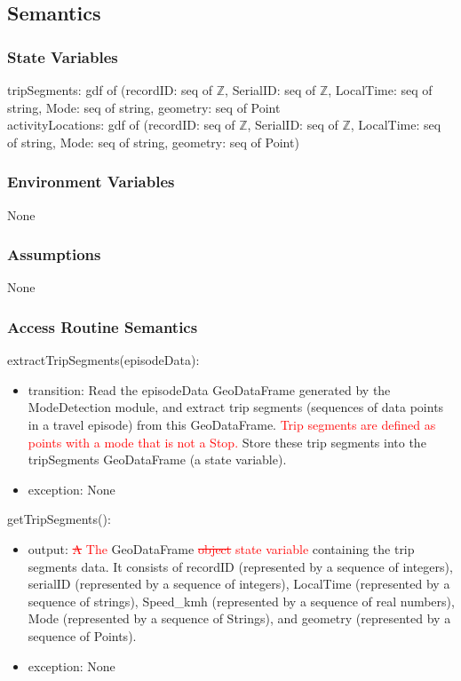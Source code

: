 \documentclass[12pt, titlepage]{article}
\begin{document}
\subsection{Semantics}

\subsubsection{State Variables}
tripSegments: gdf of (recordID: seq of $\mathbb{Z}$, SerialID: seq of $\mathbb{Z}$, LocalTime: seq of string, Mode: seq of string, geometry: seq of Point
\\
activityLocations: gdf of (recordID: seq of $\mathbb{Z}$, SerialID: seq of $\mathbb{Z}$, LocalTime: seq of string, Mode: seq of string, geometry: seq of Point)

\subsubsection{Environment Variables}

None

\subsubsection{Assumptions}

None

\subsubsection{Access Routine Semantics}

\noindent extractTripSegments(episodeData):
\begin{itemize}
\item transition: Read the episodeData GeoDataFrame generated by the ModeDetection module, and extract trip segments (sequences of data points in a travel episode) from this GeoDataFrame. \textcolor{red}{Trip segments are defined as points with a mode that is not a Stop.} Store these trip segments into the tripSegments GeoDataFrame (a state variable).
\item exception: None
\end{itemize}

\noindent getTripSegments():
\begin{itemize}
\item output: \textcolor{red}{\sout{A} The} GeoDataFrame \textcolor{red}{\sout{object} state variable} containing the trip segments data.  It consists of recordID (represented by a sequence of integers), serialID (represented by a sequence of integers), LocalTime (represented by a sequence of strings), Speed\_kmh (represented by a sequence of real numbers), Mode (represented by a sequence of Strings), and geometry (represented by a sequence of Points).
\item exception: None
\end{itemize}
\end{document}
